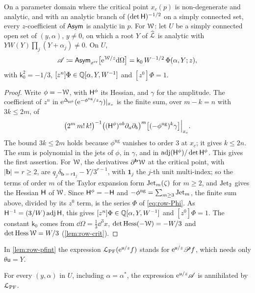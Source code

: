 \begin{lem}
\label{lem:row-analytic}
On a parameter domain where the critical point $x_c(p)$ is non-degenerate and analytic, and with an analytic branch of $(\det\mathsf{H})^{-1/2}$ on a simply connected set, every $z$-coefficient of $\mathsf{Asym}$ is analytic in $p$. For $\mathcal{W}$: let $U$ be a simply connected open set of $(y,\alpha)$, $y\neq0$, on which a root $Y$ of $\widehat{\mathcal{L}}$ is analytic with $YW(Y)\prod_j(Y+\alpha_j)\neq0$. On $U$,
\[
\mathscr{A}\coloneqq\mathsf{Asym}_{x^{\mathrm{cr}}}\big[\mathrm{e}^{\mathcal{W}/z}\mathrm{d}\Omega\big]=\mathsf{k}_0\,W^{-1/2}\,\Phi(\alpha,Y;z),
\]
with $\mathsf{k}_0^2=-1/3$, $[z^n]\Phi\in\mathbb{Q}[\alpha,Y,W^{-1}]$ and $[z^0]\Phi=1$.
\end{lem}

\begin{proof}
Write $\phi=-\mathcal{W}$, with $\mathsf{H}^{\phi}$ its Hessian, and $\gamma$ for the amplitude. The coefficient of $z^n$ in $\mathrm{e}^{\Delta_{\mathsf{H}^\phi}}(\mathrm{e}^{-\phi^{\mathrm{ng}}/z}\gamma)|_{x_c}$ is the finite sum, over $m-k=n$ with $3k\leq2m$, of
\[
\big(2^m\,m!\,k!\big)^{-1}\big((\mathsf{H}^{\phi})^{ab}\partial_a\partial_b\big)^m\big[(-\phi^{\mathrm{ng}})^k\gamma\big]\Big|_{x_c}.
\]
The bound $3k\leq2m$ holds because $\phi^{\mathrm{ng}}$ vanishes to order $3$ at $x_c$; it gives $k\leq2n$. The sum is polynomial in the jets of $\phi$, in $\gamma$, and in $\mathrm{adj}(\mathsf{H}^\phi)/\det\mathsf{H}^\phi$. This gives the first assertion. For $\mathcal{W}$, the derivatives $\partial^{\mathbf{b}}\mathcal{W}$ at the critical point, with $|\mathbf{b}|=r\geq2$, are $q_j\delta_{\mathbf{b}=r\mathbf{1}_j}-Y/3^{r-1}$, with $\mathbf{1}_j$ the $j$-th unit multi-index; so the terms of order $m$ of the Taylor expansion form $\mathrm{Jet}_m(\zeta)$ for $m\geq2$, and $\mathrm{Jet}_2$ gives the Hessian $\mathsf{H}$ of $\mathcal{W}$. Since $\mathsf{H}^\phi=-\mathsf{H}$ and $-\phi^{\mathrm{ng}}=\sum_{m\geq3}\mathrm{Jet}_m$, the finite sum above, divided by its $z^0$ term, is the series $\Phi$ of \eqref{eq:row-Phi}. As $\mathsf{H}^{-1}=(3/W)\,\mathrm{adj}\,\mathsf{H}$, this gives $[z^n]\Phi\in\mathbb{Q}[\alpha,Y,W^{-1}]$ and $[z^0]\Phi=1$. The constant $\mathsf{k}_0$ comes from $\dd\Omega=\frac13\dd^3x$, $\det\mathrm{Hess}(-\mathcal{W})=-W/3$ and $\det\mathrm{Hess}\,\mathcal{W}=W/3$ (\cref{lem:row-crit}).
\end{proof}

In \cref{lem:row-pfint} the expression $\mathcal{L}_{\mathrm{PF}}(\mathrm{e}^{\mathsf{u}/z}f)$ stands for $\mathrm{e}^{\mathsf{u}/z}\mathscr{P} f$, which needs only $\theta\mathsf{u}=Y$.
\begin{lem}
\label{lem:row-pfint}
For every $(y,\alpha)$ in $U$, including $\alpha=\alpha^*$, the expression $\mathrm{e}^{\mathsf{u}/z}\mathscr{A}$ is annihilated by $\mathcal{L}_{\mathrm{PF}}$.
\end{lem}

